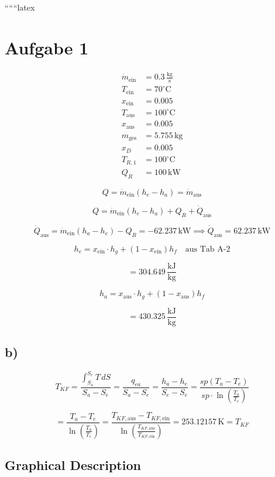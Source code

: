 
``````latex


\section*{Aufgabe 1}

\begin{align*}
\dot{m}_{\text{ein}} &= 0.3 \, \frac{\text{kg}}{\text{s}} \\
T_{\text{ein}} &= 70^\circ \text{C} \\
x_{\text{ein}} &= 0.005 \\
T_{\text{aus}} &= 100^\circ \text{C} \\
x_{\text{aus}} &= 0.005 \\
m_{\text{ges}} &= 5.755 \, \text{kg} \\
x_D &= 0.005 \\
T_{R,1} &= 100^\circ \text{C} \\
Q_R &= 100 \, \text{kW}
\end{align*}

\[
Q = \dot{m}_{\text{ein}} (h_e - h_a) = \dot{m}_{\text{aus}}
\]

\[
Q = \dot{m}_{\text{ein}} (h_e - h_a) + Q_R + \dot{Q}_{\text{aus}}
\]

\[
\dot{Q}_{\text{aus}} = \dot{m}_{\text{ein}} (h_a - h_e) - Q_R = -62.237 \, \text{kW} \implies \dot{Q}_{\text{aus}} = 62.237 \, \text{kW}
\]

\[
h_e = x_{\text{ein}} \cdot h_g + (1 - x_{\text{ein}}) h_f \quad \text{aus Tab A-2}
\]

\[
= 304.649 \, \frac{\text{kJ}}{\text{kg}}
\]

\[
h_a = x_{\text{aus}} \cdot h_g + (1 - x_{\text{aus}}) h_f
\]

\[
= 430.325 \, \frac{\text{kJ}}{\text{kg}}
\]

\subsection*{b)}

\[
T_{KF} = \frac{\int_{S_a}^{S_e} T \, dS}{S_a - S_e} = \frac{q_{ea}}{S_a - S_e} = \frac{h_a - h_e}{S_e - S_e} = \frac{sp (T_a - T_e)}{sp \cdot \ln \left( \frac{T_a}{T_e} \right)}
\]

\[
= \frac{T_a - T_e}{\ln \left( \frac{T_a}{T_e} \right)} = \frac{T_{KF, \text{aus}} - T_{KF, \text{ein}}}{\ln \left( \frac{T_{KF, \text{aus}}}{T_{KF, \text{ein}}} \right)} = 253.12157 \, \text{K} = T_{KF}
\]

\subsection*{Graphical Description}

